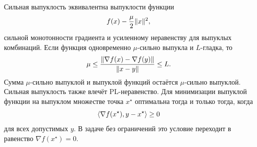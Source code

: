 \begin{lecturesummary}
Сильная выпуклость эквивалентна выпуклости функции
\[
    f(x)-\frac{\mu}{2}\lVert x\rVert^2,
\]
сильной монотонности градиента и усиленному неравенству для выпуклых
комбинаций. Если функция одновременно \(\mu\)-сильно выпукла и
\(L\)-гладка, то
\[
    \mu
    \le
    \frac{
        \lVert\nabla f(x)-\nabla f(y)\rVert
    }{
        \lVert x-y\rVert
    }
    \le
    L.
\]
Сумма \(\mu\)-сильно выпуклой и выпуклой функций остаётся
\(\mu\)-сильно выпуклой. Сильная выпуклость также влечёт
PL-неравенство. Для минимизации выпуклой функции на выпуклом
множестве точка \(x^\star\) оптимальна тогда и только тогда, когда
\[
    \left\langle \nabla f(x^\star),y-x^\star \right\rangle\ge0
\]
для всех допустимых \(y\). В задаче без ограничений это условие
переходит в равенство \(\nabla f(x^\star)=0\).
\end{lecturesummary}